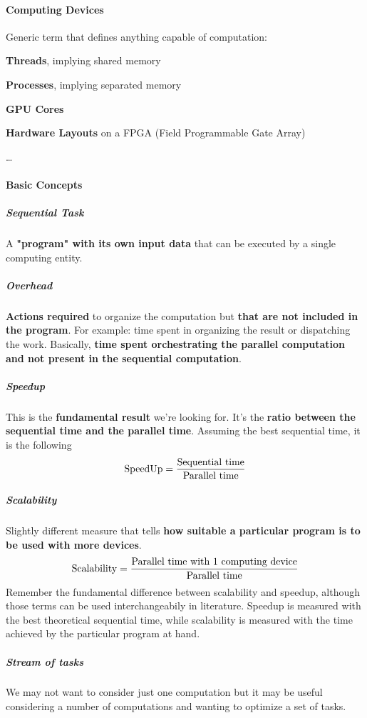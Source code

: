 \documentclass[10pt]{report}
\begin{document}
\paragraph{Computing Devices} Generic term that defines anything capable of computation:\begin{list}{}{}
	\item \textbf{Threads}, implying shared memory
	\item \textbf{Processes}, implying separated memory
	\item \textbf{GPU Cores}
	\item \textbf{Hardware Layouts} on a FPGA (Field Programmable Gate Array)
	\item \ldots
\end{list}
\paragraph{Basic Concepts}
\subparagraph{Sequential Task} A \textbf{"program" with its own input data} that can be executed by a single computing entity.
\subparagraph{Overhead} \textbf{Actions required} to organize the computation but \textbf{that are not included in the program}. For example: time spent in organizing the result or dispatching the work. Basically, \textbf{time spent orchestrating the parallel computation and not present in the sequential computation}.
\subparagraph{Speedup} This is the \textbf{fundamental result} we're looking for. It's the \textbf{ratio between the sequential time and the parallel time}. Assuming the best sequential time, it is the following
$$\hbox{SpeedUp} = \frac{\hbox{Sequential time}}{\hbox{Parallel time}}$$
\subparagraph{Scalability} Slightly different measure that tells \textbf{how suitable a particular program is to be used with more devices}.
$$\hbox{Scalability}=\frac{\hbox{Parallel time with 1 computing device}}{\hbox{Parallel time}}$$
Remember the fundamental difference between scalability and speedup, although those terms can be used interchangeabily in literature. Speedup is measured with the best theoretical sequential time, while scalability is measured with the time achieved by the particular program at hand.
\subparagraph{Stream of tasks} We may not want to consider just one computation but it may be useful considering a number of computations and wanting to optimize a set of tasks.
\end{document}
